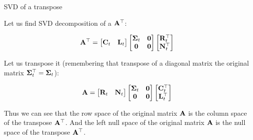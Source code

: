 \documentclass{beamer}
\begin{document}
\begin{frame}{SVD of a transpose}
	\begin{flushleft}
		
		Let us find SVD decomposition of a $\mathbf{A}^\top$:
		
		\begin{equation}
			\mathbf{A}^\top = 
			\begin{bmatrix}
				\mathbf{C}_t & \mathbf{L}_t
			\end{bmatrix}
			\begin{bmatrix}
				\mathbf{\Sigma}_t & \mathbf{0} \\
				\mathbf{0} & \mathbf{0}
			\end{bmatrix}
			\begin{bmatrix}
				\mathbf{R}_t^\top \\ \mathbf{N}_t^\top
			\end{bmatrix}
		\end{equation}
		
		Let us transpose it (remembering that transpose of a diagonal matrix the original matrix $\mathbf{\Sigma}_t^\top = \mathbf{\Sigma}_t$):
		
		
		\begin{equation}
			\mathbf{A} = 
			\begin{bmatrix}
				\mathbf{R}_t & \mathbf{N}_t
			\end{bmatrix}
			\begin{bmatrix}
				\mathbf{\Sigma}_t & \mathbf{0} \\
				\mathbf{0} & \mathbf{0}
			\end{bmatrix}
			\begin{bmatrix}
				\mathbf{C}_t^\top \\ \mathbf{L}_t^\top
			\end{bmatrix}
		\end{equation}
		
		Thus we can see that the row space of the original matrix $\mathbf{A}$ is the column space of the transpose $\mathbf{A}^\top$. And the left null space of the original matrix $\mathbf{A}$ is the null space of the transpose $\mathbf{A}^\top$.
		
		
	\end{flushleft}
\end{frame}
\end{document}
